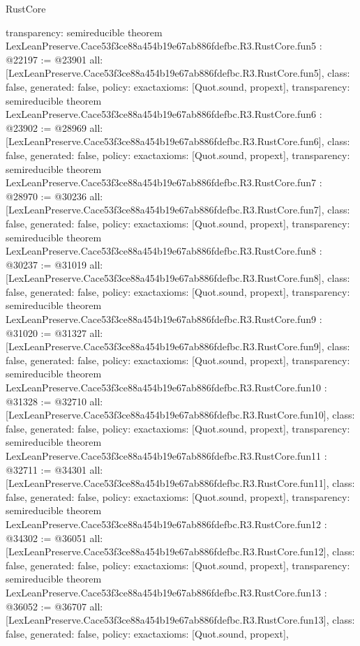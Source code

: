 \begin{lexlean}{RustCore}
\begin{coremodule}
{  transparency: semireducible
}
theorem LexLeanPreserve.Cace53f3ce88a454b19e67ab886fdefbc.R3.RustCore.fun5 : @22197 := @23901 {
  all: [LexLeanPreserve.Cace53f3ce88a454b19e67ab886fdefbc.R3.RustCore.fun5],
  class: false,
  generated: false,
  policy: exact{axioms: [Quot.sound, propext]},
  transparency: semireducible
}
theorem LexLeanPreserve.Cace53f3ce88a454b19e67ab886fdefbc.R3.RustCore.fun6 : @23902 := @28969 {
  all: [LexLeanPreserve.Cace53f3ce88a454b19e67ab886fdefbc.R3.RustCore.fun6],
  class: false,
  generated: false,
  policy: exact{axioms: [Quot.sound, propext]},
  transparency: semireducible
}
theorem LexLeanPreserve.Cace53f3ce88a454b19e67ab886fdefbc.R3.RustCore.fun7 : @28970 := @30236 {
  all: [LexLeanPreserve.Cace53f3ce88a454b19e67ab886fdefbc.R3.RustCore.fun7],
  class: false,
  generated: false,
  policy: exact{axioms: [Quot.sound, propext]},
  transparency: semireducible
}
theorem LexLeanPreserve.Cace53f3ce88a454b19e67ab886fdefbc.R3.RustCore.fun8 : @30237 := @31019 {
  all: [LexLeanPreserve.Cace53f3ce88a454b19e67ab886fdefbc.R3.RustCore.fun8],
  class: false,
  generated: false,
  policy: exact{axioms: [Quot.sound, propext]},
  transparency: semireducible
}
theorem LexLeanPreserve.Cace53f3ce88a454b19e67ab886fdefbc.R3.RustCore.fun9 : @31020 := @31327 {
  all: [LexLeanPreserve.Cace53f3ce88a454b19e67ab886fdefbc.R3.RustCore.fun9],
  class: false,
  generated: false,
  policy: exact{axioms: [Quot.sound, propext]},
  transparency: semireducible
}
theorem LexLeanPreserve.Cace53f3ce88a454b19e67ab886fdefbc.R3.RustCore.fun10 : @31328 := @32710 {
  all: [LexLeanPreserve.Cace53f3ce88a454b19e67ab886fdefbc.R3.RustCore.fun10],
  class: false,
  generated: false,
  policy: exact{axioms: [Quot.sound, propext]},
  transparency: semireducible
}
theorem LexLeanPreserve.Cace53f3ce88a454b19e67ab886fdefbc.R3.RustCore.fun11 : @32711 := @34301 {
  all: [LexLeanPreserve.Cace53f3ce88a454b19e67ab886fdefbc.R3.RustCore.fun11],
  class: false,
  generated: false,
  policy: exact{axioms: [Quot.sound, propext]},
  transparency: semireducible
}
theorem LexLeanPreserve.Cace53f3ce88a454b19e67ab886fdefbc.R3.RustCore.fun12 : @34302 := @36051 {
  all: [LexLeanPreserve.Cace53f3ce88a454b19e67ab886fdefbc.R3.RustCore.fun12],
  class: false,
  generated: false,
  policy: exact{axioms: [Quot.sound, propext]},
  transparency: semireducible
}
theorem LexLeanPreserve.Cace53f3ce88a454b19e67ab886fdefbc.R3.RustCore.fun13 : @36052 := @36707 {
  all: [LexLeanPreserve.Cace53f3ce88a454b19e67ab886fdefbc.R3.RustCore.fun13],
  class: false,
  generated: false,
  policy: exact{axioms: [Quot.sound, propext]},
}
\end{coremodule}
\end{lexlean}
